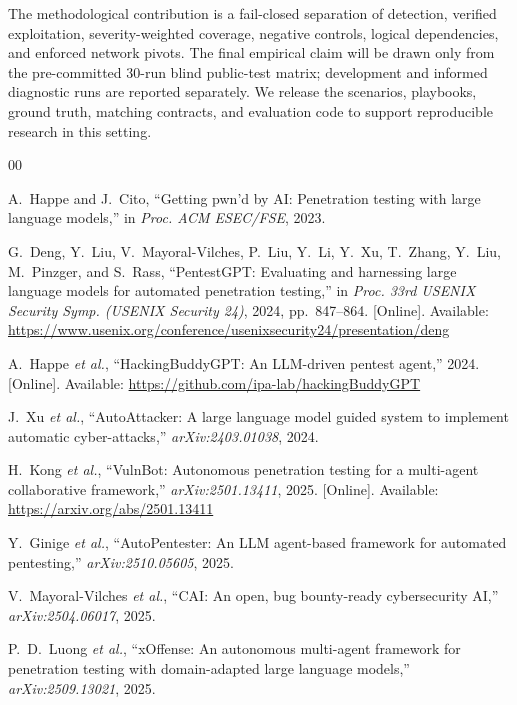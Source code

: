 \documentclass[conference,compsoc]{IEEEtran}
\begin{document}
The methodological contribution is a fail-closed separation of detection,
verified exploitation, severity-weighted coverage, negative controls, logical
dependencies, and enforced network pivots. The final empirical claim will be
drawn only from the pre-committed 30-run blind public-test matrix; development
and informed diagnostic runs are reported separately. We release the scenarios,
playbooks, ground truth, matching contracts, and evaluation code to support
reproducible research in this setting.
\begin{thebibliography}{00}

 A.~Happe and J.~Cito, ``Getting pwn'd by AI: Penetration testing with large language models,'' in \textit{Proc. ACM ESEC/FSE}, 2023.

 G.~Deng, Y.~Liu, V.~Mayoral-Vilches, P.~Liu, Y.~Li, Y.~Xu, T.~Zhang, Y.~Liu, M.~Pinzger, and S.~Rass, ``PentestGPT: Evaluating and harnessing large language models for automated penetration testing,'' in \textit{Proc. 33rd USENIX Security Symp. (USENIX Security 24)}, 2024, pp.~847--864. [Online]. Available: \url{https://www.usenix.org/conference/usenixsecurity24/presentation/deng}

 A.~Happe \textit{et al.}, ``HackingBuddyGPT: An LLM-driven pentest agent,'' 2024. [Online]. Available: \url{https://github.com/ipa-lab/hackingBuddyGPT}

 J.~Xu \textit{et al.}, ``AutoAttacker: A large language model guided system to implement automatic cyber-attacks,'' \textit{arXiv:2403.01038}, 2024.

 H.~Kong \textit{et al.}, ``VulnBot: Autonomous penetration testing for a multi-agent collaborative framework,'' \textit{arXiv:2501.13411}, 2025. [Online]. Available: \url{https://arxiv.org/abs/2501.13411}

 Y.~Ginige \textit{et al.}, ``AutoPentester: An LLM agent-based framework for automated pentesting,'' \textit{arXiv:2510.05605}, 2025.

 V.~Mayoral-Vilches \textit{et al.}, ``CAI: An open, bug bounty-ready cybersecurity AI,'' \textit{arXiv:2504.06017}, 2025.

 P.~D.~Luong \textit{et al.}, ``xOffense: An autonomous multi-agent framework for penetration testing with domain-adapted large language models,'' \textit{arXiv:2509.13021}, 2025.


\end{thebibliography}
\end{document}
